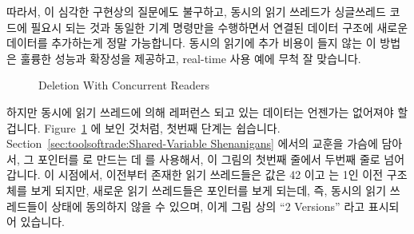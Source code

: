 따라서, 이 심각한 구현상의 질문에도 불구하고, 동시의 읽기 쓰레드가 싱글쓰레드
코드에 필요시 되는 것과 동일한 기계 명령만을 수행하면서 연결된 데이터 구조에
새로운 데이터를 추가하는게 정말 가능합니다.
동시의 읽기에 추가 비용이 들지 않는 이 방법은 훌륭한 성능과 확장성을 제공하고,
real-time 사용 예에 무척 잘 맞습니다.

\begin{figure}[tb]
\centering
{}
\caption{Deletion With Concurrent Readers}
\label{fig:defer:Deletion With Concurrent Readers}
\end{figure}

하지만 동시에 읽기 쓰레드에 의해 레퍼런스 되고 있는 데이터는 언젠가는 없어져야
할 겁니다.
Figure~\ref{fig:defer:Deletion With Concurrent Readers} 에 보인 것처럼, 첫번째
단계는 쉽습니다.
Section~\ref{sec:toolsoftrade:Shared-Variable Shenanigans} 에서의 교훈을 가슴에
담아서, 그 포인터를  로 만드는 데  를 사용해서, 이
그림의 첫번째 줄에서 두번째 줄로 넘어갑니다.
이 시점에서, 이전부터 존재한 읽기 쓰레드들은  값은 42 이고
 는 1인 이전 구조체를 보게 되지만, 새로운 읽기 쓰레드들은 
포인터를 보게 되는데, 즉, 동시의 읽기 쓰레드들이 상태에 동의하지 않을 수
있으며, 이게 그림 상의 ``2 Versions'' 라고 표시되어 있습니다.
\iffalse


